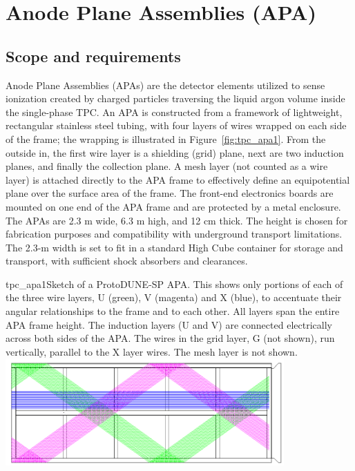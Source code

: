 
\section{Anode Plane Assemblies (APA)}

\subsection{Scope and requirements}

Anode Plane Assemblies (APAs) are the detector elements utilized to sense ionization created by charged particles traversing the liquid argon volume inside the single-phase TPC.  
An APA is constructed from a framework of lightweight, rectangular stainless steel tubing, with
four layers of wires wrapped on each side of the frame; the wrapping is illustrated in  Figure~\ref{fig:tpc_apa1}. From the outside in, the first wire layer
is a shielding (grid) plane, next are two induction planes, and finally the collection plane. 
A mesh layer (not counted as a wire layer) is attached directly to the APA frame to effectively define an equipotential plane over the surface area of the frame.
The front-end
electronics boards are mounted on one end of the APA frame and are protected by a metal enclosure.
The APAs are 2.3 m wide, 6.3 m high, and 12 cm thick. The height is chosen for fabrication
purposes and compatibility with underground transport limitations. The 2.3-m width is set to fit
in a standard High Cube container for storage and transport, with sufficient shock absorbers and
clearances.

\begin{cdrfigure}{tpc_apa1}{Sketch of a ProtoDUNE-SP APA. This shows only portions of each of the three wire layers, U (green), V (magenta) and X (blue), to accentuate their angular relationships to the frame and to each other.  All layers span the entire APA frame height. The induction layers (U and V) are connected electrically across both sides of the APA.  The wires in the grid layer, G (not shown), run vertically, parallel to the X layer wires.  The mesh layer is not shown.}
\includegraphics[width=0.8\textwidth, angle=90]{figures/tpc_apa1.png} 
\end{cdrfigure}


